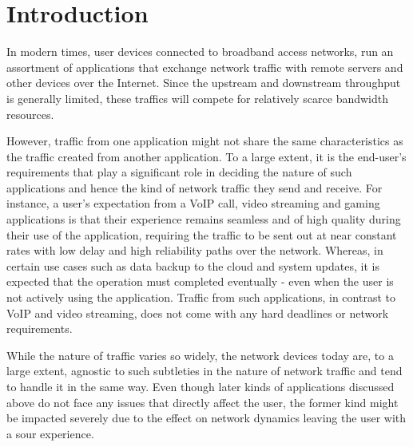 \section{Introduction}
\label{sec:introduction}

In modern times, user devices connected to broadband access networks, run an assortment of applications that exchange network traffic with remote servers and other devices over the Internet. Since the upstream and downstream throughput is generally limited, these traffics will compete for relatively scarce bandwidth resources. 

However, traffic from one application might not share the same characteristics as the traffic created from another application. To a large extent, it is the end-user's requirements that play a significant role in deciding the nature of such applications and hence the kind of network traffic they send and receive. For instance, a user's expectation from a VoIP call, video streaming and gaming applications is that their experience remains seamless and of high quality during their use of the application, requiring the traffic to be sent out at near constant rates with low delay and high reliability paths over the network. Whereas, in certain use cases such as data backup to the cloud and system updates, it is expected that the operation must completed eventually - even when the user is not actively using the application. Traffic from such applications, in contrast to VoIP and video streaming, does not come with any hard deadlines or network requirements.

While the nature of traffic varies so widely, the network devices today are, to a large extent, agnostic to such subtleties in the nature of network traffic and tend to handle it in the same way. Even though later kinds of applications discussed above do not face any issues that directly affect the user, the former kind might be impacted severely due to the effect on network dynamics leaving the user with a sour experience. 


